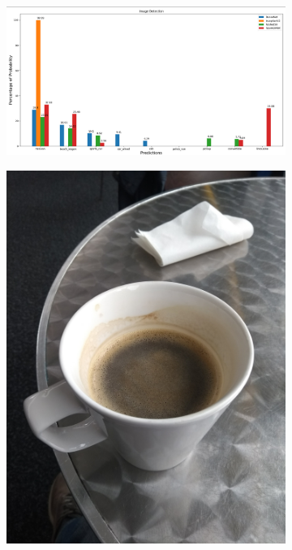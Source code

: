 \begin{figure}[H]
\begin{subfigure}{0.25\textwidth}
      \end{subfigure}
      \begin{subfigure}{0.74\textwidth}
      \includegraphics[width=\textwidth]{Sections/4InitialWork/4_images/run3_res.png}
      \end{subfigure}
      \centering
      \captionsetup{justification=centering}
      \begin{subfigure}{0.25\textwidth}
      \includegraphics[width=\textwidth]{Sections/4InitialWork/4_images/run4_pic.jpg} 

\end{subfigure}
\end{figure}
